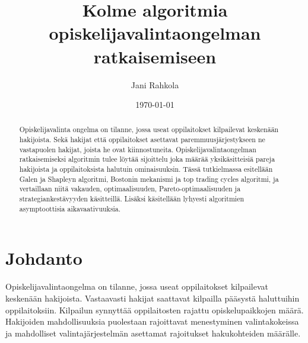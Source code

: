 \documentclass[twoside]{tktltiki}
\begin{document}
\title{Kolme algoritmia opiskelijavalintaongelman ratkaisemiseen}
\author{Jani Rahkola}
\date{\today}



\maketitle

\doublespacing

\subject{Tietojenkäsittelytiede}

\def\hyph{-\penalty0\hskip0pt\relax}
\hyphenation{}

\begin{abstract}
Opiskelijavalinta ongelma on tilanne, jossa useat oppilaitokset
kilpailevat keskenään hakijoista. Sekä hakijat että oppilaitokset
asettavat paremmuusjärjestykseen ne vastapuolen hakijat, joista he
ovat kiinnostuneita. Opiskelijavalintaongelman ratkaisemiseksi
algoritmin tulee löytää sijoittelu joka määrää yksikäsitteisiä pareja
hakijoista ja oppilaitoksista halutuin ominaisuuksin. Tässä
tutkielmassa esitellään Galen ja Shapleyn algoritmi, Bostonin
mekanismi ja top trading cycles algoritmi, ja vertaillaan niitä
vakauden, optimaalisuuden, Pareto\hyph optimaalisuuden ja
strategiankestävyyden käsitteillä. Lisäksi käsitellään lyhyesti
algoritmien asymptoottisia aikavaativuuksia.
\end{abstract}

\mytableofcontents

\section{Johdanto}

Opiskelijavalintaongelma on tilanne, jossa useat oppilaitokset
kilpailevat keskenään hakijoista. Vastaavasti hakijat saattavat
kilpailla pääsystä haluttuihin oppilaitoksiin. Kilpailun synnyttää
oppilaitosten rajattu opiskelupaikkojen määrä. Hakijoiden
mahdollisuuksia puolestaan rajoittavat menestyminen valintakokeissa ja
mahdolliset valintajärjestelmän asettamat rajoitukset hakukohteiden
määrälle.
\end{document}
